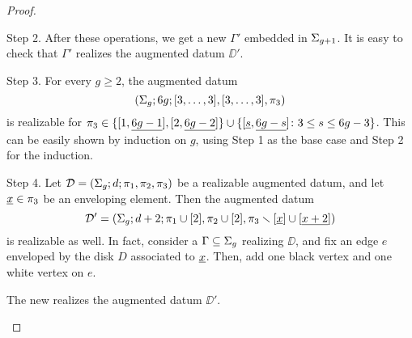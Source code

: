 \begin{proof}
\begin{sideline}{Step 2.}
\egroup
After these operations, we get a new \dessin{} $\Gamma'$ embedded in $\Sigma_{g+1}$. It is easy to check that $\Gamma'$ realizes the augmented datum $\DD'$.
\end{sideline}
\begin{sideline}{Step 3.}
For every $g\ge 2$, the augmented datum 
\[
(\Sigma_{g};6g;[3,\ldots,3],[3,\ldots,3],\pi_3)
\]
is realizable for $\pi_3\in\{[1,\underline{6g-1}],[2,\underline{6g-2}]\}\cup\{[\underline{s},\underline{6g-s}]\colon 3\le s\le 6g-3\}$. This can be easily shown by induction on $g$, using Step 1 as the base case and Step 2 for the induction.
\end{sideline}
\def\myscale{1.5}
\begin{sideline}{Step 4.}
Let $\mathcal{D}=(\Sigma_{g};d;\pi_1,\pi_2,\pi_3)$ be a realizable augmented datum, and let $\underline{x}\in\pi_3$ be an enveloping element. Then the augmented datum
\[
\mathcal{D}'=(\Sigma_{g};d+2;\pi_1\cup[2],\pi_2\cup[2],\pi_3\smallsetminus[\underline{x}]\cup[\underline{x+2}])
\]
is realizable as well. In fact, consider a \dessin{} $\Gamma\subseteq\Sigma_{g}$ realizing $\DD$, and fix an edge $e$ enveloped by the disk $D$ associated to $\underline{x}$. Then, add one black vertex and one white vertex on $e$.
\begin{center}
\def\picturesetup{
\begin{pgfonlayer}{graph edge below}
\begin{scope}
\clip (-.8,0) to[bend left=90] (.8,0) to[bend left=90] (-.8,0);
\fill[disk 1] circle(3);
\draw[disk 1 boundary enveloped,line width=\edgelinewidth] (-.5,0) pic{black vertex} to (.5,0) pic {white vertex};
\path[black edge] (-.5,0) to (-1,0);
\path[black edge] (.5,0) to (1,0);
\end{scope}
\end{pgfonlayer}
}
\end{center}
The new \dessin{} realizes the augmented datum $\DD'$.
\end{sideline}


\end{proof}
